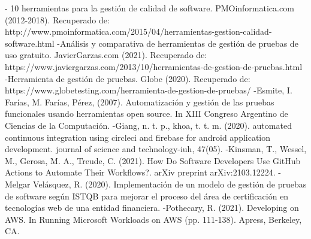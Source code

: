 \documentclass[twoside,twocolumn]{article}
\begin{document}

\begin{thebibliography}{XXX0000}
	
\bibitem - 10 herramientas para la gestión de calidad de software. PMOinformatica.com (2012-2018). Recuperado de:  http://www.pmoinformatica.com/2015/04/herramientas-gestion-calidad-software.html
	\bibitem -Análisis y comparativa de herramientas de gestión de pruebas de uso gratuito. JavierGarzas.com (2021). Recuperado de: https://www.javiergarzas.com/2013/10/herramientas-de-gestion-de-pruebas.html 
    \bibitem -Herramienta de gestión de pruebas. Globe (2020). Recuperado de: https://www.globetesting.com/herramienta-de-gestion-de-pruebas/ 
    \bibitem -Esmite, I. Farías, M. Farías,  Pérez, (2007). Automatización y gestión de las pruebas funcionales usando herramientas open source. In XIII Congreso Argentino de Ciencias de la Computación. 
    \bibitem -Giang, n. t. p.,  khoa, t. t. m. (2020). automated continuous integration using circleci and firebase for android application development. journal of science and technology-iuh, 47(05).
    \bibitem -Kinsman, T., Wessel, M., Gerosa, M. A.,  Treude, C. (2021). How Do Software Developers Use GitHub Actions to Automate Their Workflows?. arXiv preprint arXiv:2103.12224. 
    \bibitem - Melgar Velásquez, R. (2020). Implementación de un modelo de gestión de pruebas de software según ISTQB para mejorar el proceso del área de certificación en tecnologías web de una entidad financiera.
    \bibitem -Pothecary, R. (2021). Developing on AWS. In Running Microsoft Workloads on AWS (pp. 111-138). Apress, Berkeley, CA.
	\end{thebibliography}

\end{document}
